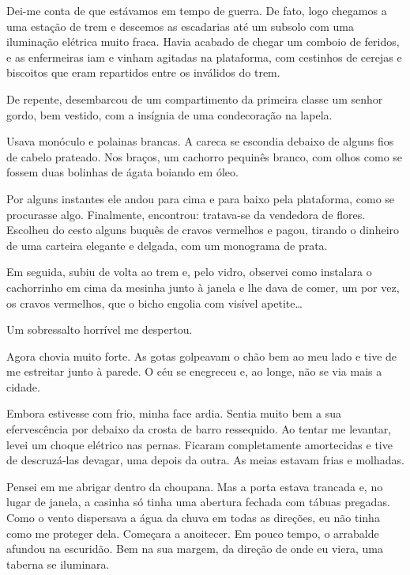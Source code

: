 
Dei-me conta de que estávamos em tempo de guerra. De fato, logo chegamos a uma
estação de trem e descemos as escadarias até um subsolo com uma iluminação
elétrica muito fraca. Havia acabado de chegar um comboio de feridos, e as
enfermeiras iam e vinham agitadas na plataforma, com cestinhos de cerejas e
biscoitos que eram repartidos entre os inválidos do trem.

De repente, desembarcou de um compartimento da primeira classe um senhor
gordo, bem vestido, com a insígnia de uma condecoração na lapela.

Usava monóculo e polainas brancas. A careca se escondia debaixo de alguns fios
de cabelo prateado. Nos braços, um cachorro pequinês branco, com olhos como
se fossem duas bolinhas de ágata boiando em óleo.

Por alguns instantes ele andou para cima e para baixo pela plataforma, como se
procurasse algo. Finalmente, encontrou: tratava-se da vendedora de flores.
Escolheu do cesto alguns buquês de cravos vermelhos e pagou, tirando o
dinheiro de uma carteira elegante e delgada, com um monograma de prata.

Em seguida, subiu de volta ao trem e, pelo vidro, observei como instalara o
cachorrinho em cima da mesinha junto à janela e lhe dava de comer, um por
vez, os cravos vermelhos, que o bicho engolia com visível apetite\ldots{}

Um sobressalto horrível me despertou.

Agora chovia muito forte. As gotas golpeavam o chão bem ao meu lado e tive de
me estreitar junto à parede. O céu se enegreceu e, ao longe, não se via mais
a cidade.

Embora estivesse com frio, minha face ardia. Sentia muito bem a sua
efervescência por debaixo da crosta de barro ressequido. Ao tentar me
levantar, levei um choque elétrico nas pernas. Ficaram completamente
amortecidas e tive de descruzá-las devagar, uma depois da outra. As meias
estavam frias e molhadas.

Pensei em me abrigar dentro da choupana. Mas a porta estava trancada e, no
lugar de janela, a casinha só tinha uma abertura fechada com tábuas pregadas.
Como o vento dispersava a água da chuva em todas as direções, eu não tinha
como me proteger dela. Começara a anoitecer. Em pouco tempo, o arrabalde
afundou na escuridão. Bem na sua margem, da direção de onde eu viera, uma
taberna se iluminara.

